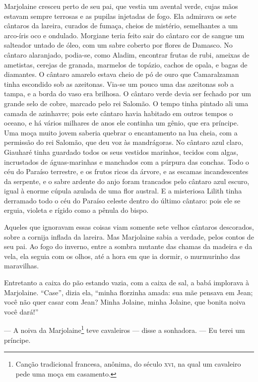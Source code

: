 Marjolaine cresceu perto de seu pai, que vestia um avental verde, cujas
mãos estavam sempre terrosas e as pupilas injetadas de fogo. Ela admirava
os sete cântaros da lareira, curados de fumaça, cheios de mistério,
semelhantes a um arco-íris oco e ondulado. Morgiane teria feito sair do
cântaro cor de sangue um salteador untado de óleo, com um sabre coberto
por flores de Damasco. No cântaro alaranjado, podia-se, como Aladim,
encontrar frutas de rubi, ameixas de ametistas, cerejas de granada,
marmelos de topázio, cachos de opala, e bagas de diamantes. O cântaro
amarelo estava cheio de pó de ouro que Camaralzaman tinha escondido sob as
azeitonas. Via-se um pouco uma das azeitonas sob a tampa, e a borda do
vaso era brilhosa. O cântaro verde devia ser fechado por um grande selo de
cobre, marcado pelo rei Salomão. O tempo tinha pintado ali uma camada de
azinhavre; pois este cântaro havia habitado em outros tempos o oceano, e
há vários milhares de anos ele continha um gênio, que era príncipe. Uma
moça muito jovem saberia quebrar o encantamento na lua cheia, com a
permissão do rei Salomão, que deu voz às mandrágoras. No cântaro azul
claro, Giauharé tinha guardado todos os seus vestidos marinhos, tecidos
com algas, incrustados de águas-marinhas e manchados com a púrpura das
conchas. Todo o céu do Paraíso terrestre, e os frutos ricos da árvore, e
as escamas incandescentes da serpente, e o sabre ardente do anjo foram
trancados pelo cântaro azul escuro, igual à enorme cúpula azulada de uma
flor austral. E a misteriosa Lilith tinha derramado todo o céu do Paraíso
celeste dentro do último cântaro: pois ele se erguia, violeta e rígido
como a pênula do bispo.

Aqueles que ignoravam essas coisas viam somente sete velhos cântaros
descorados, sobre a cornija inflada da lareira. Mas Marjolaine sabia a
verdade, pelos contos de seu pai. Ao fogo do inverno, entre a sombra
mutante das chamas da madeira e da vela, ela seguia com os olhos, até a
hora em que ia dormir, o murmurinho das maravilhas.

Entretanto a caixa do pão estando vazia, com a caixa de sal, a babá
implorava à Marjolaine. “Case'', dizia ela, ``minha florzinha amada: sua mãe
pensava em Jean; você não quer casar com Jean? Minha Jolaine, minha
Jolaine, que bonita noiva você dará!”

--- A noiva da Marjolaine\footnote{ Canção tradicional francesa,
anônima, do século \textsc{xvi}, na qual um cavaleiro pede uma moça em casamento.}
teve cavaleiros --- disse a sonhadora. --- Eu terei um príncipe.

